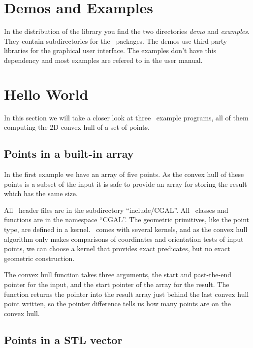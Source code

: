 \section{Demos and Examples}

In the distribution of the library  you find the two directories {\em demo}
and {\em examples}. They contain subdirectories for the \cgal\ packages.  
The demos use third party libraries for the graphical user interface. The 
examples don't have this dependency and most examples are refered to in the 
user manual.



\section{Hello World}

In this section we will take a closer look at three \cgal\ example
programs, all of them computing the 2D convex hull of a set of points.


\subsection{Points in a built-in array}

In the first example we have an array of five points.
As the convex hull of these points is a subset of the input
it is safe to provide an array for storing the result which
has the same size.



All \cgal\ header files are in the subdirectory ``include/CGAL''.  All \cgal\ 
classes and functions are in the namespace ``CGAL''.  The geometric
primitives, like the point type, are defined in a kernel. \cgal\ comes
with several kernels, and as the convex hull algorithm only makes
comparisons of coordinates and orientation tests of input points,
we can choose a kernel that provides exact predicates, but no 
exact geometric construction.

The convex hull function takes three arguments, the start
and past-the-end pointer for the input, and the start pointer of the 
array for the result. The function returns the pointer
into the result array just behind the last convex hull
point written, so the pointer difference tells us how
many points are on the convex hull. 
 

\subsection{Points in a STL vector}

